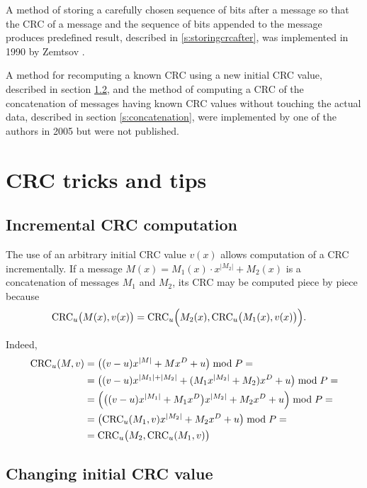 \documentclass{article}
\begin{document}
A method of storing a carefully chosen sequence of bits after a message so
that the CRC of a message and the sequence of bits appended to the message
produces predefined result, described in \ref{s:storingcrcafter}, was
implemented in 1990 by Zemtsov \cite{Zemtsov90}.

A method for recomputing a known CRC using a new initial CRC value,
described in section \ref{s:changinginitialvalue}, and the method of
computing a CRC of the concatenation of messages having known CRC values
without touching the actual data, described in section
\ref{s:concatenation}, were implemented by one of the authors in 2005 but
were not published.


\section{CRC tricks and tips}


\subsection{Incremental CRC computation} \label{s:incrementalcrc}

The use of an arbitrary initial CRC value $v(x)$ allows computation of a CRC
incrementally. If a message
  $M(x) = M_1(x) \cdot x^{|M_2|} + M_2(x)$
is a concatenation of messages $M_1$ and $M_2$, its CRC may be computed
piece by piece because
  \begin{align}
    \label{e:incremental}
    {\rm CRC}_u\bigl(M(x), v(x)\bigr)
      &= {\rm CRC}_u\Bigl(M_2(x), {\rm CRC}_u\bigl(M_1(x), v(x)\bigr)\Bigr).
  \end{align}

Indeed,
  \begin{align*}
    {\rm CRC}_u(M, v)
      &= \bigl((v-u) x^{|M|} + M x^D + u\bigr) \bmod P = \\
      &= \bigl((v-u) x^{|M_1|+|M_2|} + (M_1 x^{|M_2|} + M_2) x^D + u\bigr) \bmod P = \\
      &= \Bigl(\bigl((v-u) x^{|M_1|} + M_1 x^D \bigr) x^{|M_2|} + M_2 x^D + u\Bigr) \bmod P = \\
      &= \bigl({\rm CRC}_u(M_1, v) x^{|M_2|} + M_2 x^D + u\bigr) \bmod P = \\
      &= {\rm CRC}_u\bigl(M_2, {\rm CRC}_u(M_1, v)\bigr)
  \end{align*}


\subsection{Changing initial CRC value} \label{s:changinginitialvalue}
\end{document}
